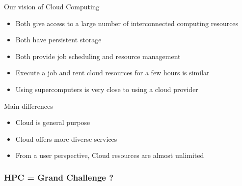 \documentclass[10pt,aspectratio=1609]{beamer}
\begin{document}
\begin{section}{Our vision of Cloud Computing}
\begin{frame}
    \begin{itemize}
      \item Both give access to a large number of interconnected computing resources
      \item Both have persistent storage
      \item Both provide job scheduling and resource management
      \item Execute a job and rent cloud resources for a few hours is similar
      \item Using supercomputers is very close to using a cloud provider
    \end{itemize}

    \begin{block}{Main differences}
      \begin{itemize}
        \item Cloud is general purpose
        \item Cloud offers more diverse services
        \item From a user perspective, Cloud resources are almost unlimited
      \end{itemize}
    \end{block}
\end{frame}


\begin{frame}
  \frametitle{HPC = Grand Challenge ?}



\end{frame}
\end{section}
\end{document}
